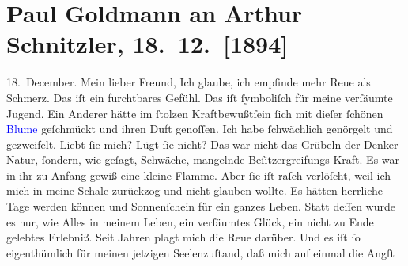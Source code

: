 

               \section[Paul Goldmann an Arthur Schnitzler, 18. 12. {[}1894{]}]{ Paul Goldmann an Arthur Schnitzler, 18. 12. {[}1894{]}}\nopagebreak{}\rehead{ }\normalsize\beginnumbering{} \toendnotes[C]{\smallbreak\pagebreak[2]} 
\toendnotes[C]{\smallbreak}\pstart
           \raggedleft{}18. December.\pend
           \pstart\center{}Mein lieber Freund,\pend\pstart
           Ich glaube, ich empfinde mehr Reue als Schmerz. Das iſt ein furchtbares Gefühl. Das
                  \label{K_mets_Goldmann_94-partII-4v}\label{K_mets_Goldmann_94-partII-4h} iſt
               ſymboliſch für meine verſäumte Jugend. Ein Anderer hätte im ſtolzen Kraftbewußtſein
               ſich mit dieſer ſchönen \textcolor{blue}{Blume}{}
               geſchmückt und ihren Duft genoſſen. Ich habe ſchwächlich genörgelt und gezweifelt.
               Liebt ſie mich? Lügt ſie nicht? Das war nicht das Grübeln der Denker-Natur, ſondern,
               wie geſagt, Schwäche, mangelnde Beſitzergreifungs-Kraft. Es war in ihr zu Anfang
               gewiß eine kleine Flamme. Aber ſie iſt {\pb}raſch
               verlöſcht, weil ich mich in meine Schale zurückzog und nicht glauben wollte. Es
               hätten herrliche Tage werden können und Sonnenſchein für ein ganzes Leben. Statt
               deſſen wurde es nur, wie Alles in meinem Leben, ein verſäumtes Glück, ein nicht zu
               Ende gelebtes Erlebniß. Seit Jahren plagt mich die Reue darüber. Und es iſt ſo
               eigenthümlich für meinen jetzigen Seelenzuſtand, daß mich auf einmal die Angſt
